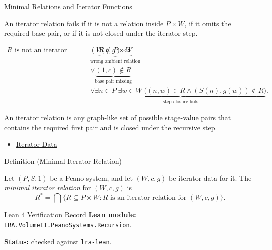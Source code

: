 \begin{topicbox}{Minimal Relations and Iterator Functions}
\begin{remark*}
An iterator relation fails if it is not a relation inside $P\times W$, if it
omits the required base pair, or if it is not closed under the iterator step.
\end{remark*}

\begin{remark*}
\[
\begin{aligned}
R \text{ is not an iterator relation for } (W,c,g)
\Longleftrightarrow\;&
\underbrace{R\not\subseteq P\times W}_{\text{wrong ambient relation}}\\
&\lor \underbrace{(1,c)\notin R}_{\text{base pair missing}}\\
&\lor \underbrace{\exists n\in P\;\exists w\in W\;
\bigl((n,w)\in R\land (S(n),g(w))\notin R\bigr)}_{\text{step closure fails}}.
\end{aligned}
\]
\end{remark*}

\begin{remark*}[Interpretation]
An iterator relation is any graph-like set of possible stage-value pairs that
contains the required first pair and is closed under the recursive step.
\end{remark*}

\begin{dependencies}
\begin{itemize}
  \item \hyperref[def:iterator-data-on-peano-system]{Iterator Data}
\end{itemize}
\end{dependencies}

\begin{definitionbox}{Definition (Minimal Iterator Relation)}
\begin{definition}
\label{def:minimal-iterator-relation}
Let $(P,S,1)$ be a Peano system, and let $(W,c,g)$ be iterator data for it.
The \emph{minimal iterator relation} for $(W,c,g)$ is
\[
R^*
=
\bigcap\{R\subseteq P\times W : R \text{ is an iterator relation for }
(W,c,g)\}.
\]
\end{definition}
\end{definitionbox}

\begin{formalizationrecord}{Lean 4 Verification Record}
\textbf{Lean module:} \texttt{LRA.VolumeII.PeanoSystems.Recursion}.\par
{}
\textbf{Status:} checked against \texttt{lra-lean}.\par


\end{formalizationrecord}
\end{topicbox}

